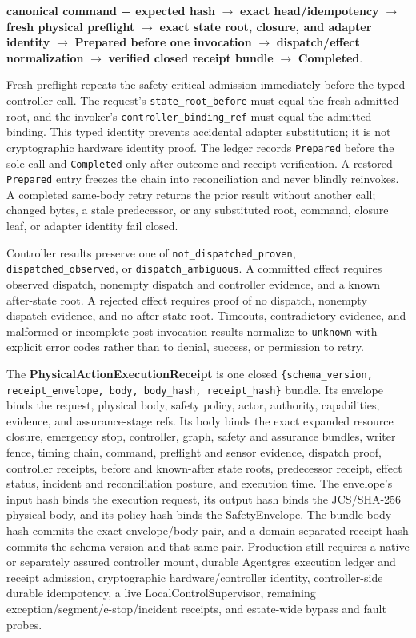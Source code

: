 \documentclass[
  11pt,
]{article}
\begin{document}
\begin{center}
\textbf{canonical command + expected hash}
$\rightarrow$ \textbf{exact head/idempotency}
$\rightarrow$ \textbf{fresh physical preflight}
$\rightarrow$ \textbf{exact state root, closure, and adapter identity}
$\rightarrow$ \textbf{Prepared before one invocation}
$\rightarrow$ \textbf{dispatch/effect normalization}
$\rightarrow$ \textbf{verified closed receipt bundle}
$\rightarrow$ \textbf{Completed}.
\end{center}

Fresh preflight repeats the safety-critical admission immediately before the
typed controller call. The request's \texttt{state\_root\_before} must equal
the fresh admitted root, and the invoker's
\texttt{controller\_binding\_ref} must equal the admitted binding. This typed
identity prevents accidental adapter substitution; it is not cryptographic
hardware identity proof. The ledger records \texttt{Prepared} before the sole
call and \texttt{Completed} only after outcome and receipt verification. A
restored \texttt{Prepared} entry freezes the chain into reconciliation and
never blindly reinvokes. A completed same-body retry returns the prior result
without another call; changed bytes, a stale predecessor, or any substituted
root, command, closure leaf, or adapter identity fail closed.

Controller results preserve one of
\texttt{not\_dispatched\_proven},
\texttt{dispatched\_observed}, or
\texttt{dispatch\_ambiguous}. A committed effect requires observed dispatch,
nonempty dispatch and controller evidence, and a known after-state root. A
rejected effect requires proof of no dispatch, nonempty dispatch evidence, and
no after-state root.
Timeouts, contradictory evidence, and malformed or incomplete post-invocation
results normalize to \texttt{unknown} with explicit error codes rather than to
denial, success, or permission to retry.

The \textbf{PhysicalActionExecutionReceipt} is one closed
\texttt{\{schema\_version, receipt\_envelope, body, body\_hash,
receipt\_hash\}} bundle. Its envelope binds the request, physical body, safety
policy, actor, authority, capabilities, evidence, and assurance-stage refs.
Its body binds the exact expanded resource closure, emergency stop, controller,
graph, safety and assurance bundles, writer fence, timing chain, command,
preflight and sensor evidence, dispatch proof, controller receipts, before and
known-after state roots, predecessor receipt, effect status, incident and
reconciliation posture, and execution time. The envelope's input hash binds
the execution request, its output hash binds the JCS/SHA-256 physical body,
and its policy hash binds the SafetyEnvelope. The bundle body hash commits the
exact envelope/body pair, and a domain-separated receipt hash commits the
schema version and that same pair. Production
still requires a native or separately assured controller mount, durable
Agentgres execution ledger and receipt admission, cryptographic
hardware/controller identity, controller-side durable idempotency, a live
LocalControlSupervisor, remaining exception/segment/e-stop/incident receipts,
and estate-wide bypass and fault probes.
\end{document}
